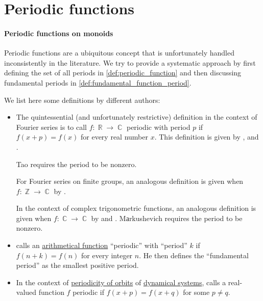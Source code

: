 \section{Periodic functions}\label{sec:periodic_functions}

\paragraph{Periodic functions on monoids}

\begin{remark}\label{rem:periodic_functions_and_periods}
  Periodic functions are a ubiquitous concept that is unfortunately handled inconsistently in the literature. We try to provide a systematic approach by first defining the set of all periods in \cref{def:periodic_function} and then discussing fundamental periods in \cref{def:fundamental_function_period}.

  We list here some definitions by different authors:
  \begin{itemize}
    \item The quintessential (and unfortunately restrictive) definition in the context of Fourier series is to call \( f: \BbbR \to \BbbC \) periodic with period \( p \) if \( f(x + p) = f(x) \) for every real number \( x \). This definition is given by
    ,
     and
    .

    Tao requires the period to be nonzero.

    For Fourier series on finite groups, an analogous definition is given when \( f: \BbbZ \to \BbbC \) by .

    In the context of complex trigonometric functions, an analogous definition is given when \( f: \BbbC \to \BbbC \) by  and . Mаrkushevich requires the period to be nonzero.

    \item {} calls an \hyperref[def:arithmetic_function]{arithmetical function} \enquote{periodic} with \enquote{period} \( k \) if \( f(n + k) = f(n) \) for every integer \( n \). He then defines the \enquote{fundamental period} as the smallest positive period.

    \item In the context of \hyperref[def:dynamical_system_periodicity]{periodicity of orbits} of \hyperref[def:dynamical_system]{dynamical systems},  calls a  real-valued function \( f \) periodic if \( f(x + p) = f(x + q) \) for some \( p \neq q \).


\end{itemize}
\end{remark}
